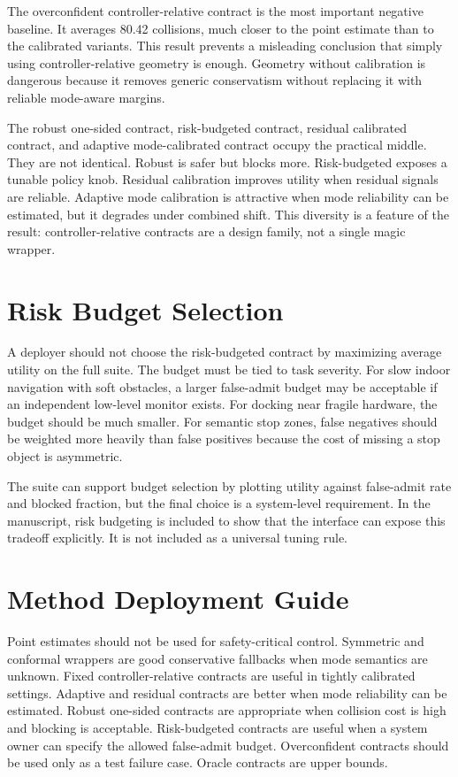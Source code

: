 \documentclass{article}
\begin{document}
The overconfident controller-relative contract is the most important negative baseline. It averages 80.42 collisions, much closer to the point estimate than to the calibrated variants. This result prevents a misleading conclusion that simply using controller-relative geometry is enough. Geometry without calibration is dangerous because it removes generic conservatism without replacing it with reliable mode-aware margins.

The robust one-sided contract, risk-budgeted contract, residual calibrated contract, and adaptive mode-calibrated contract occupy the practical middle. They are not identical. Robust is safer but blocks more. Risk-budgeted exposes a tunable policy knob. Residual calibration improves utility when residual signals are reliable. Adaptive mode calibration is attractive when mode reliability can be estimated, but it degrades under combined shift. This diversity is a feature of the result: controller-relative contracts are a design family, not a single magic wrapper.

\section{Risk Budget Selection}

A deployer should not choose the risk-budgeted contract by maximizing average utility on the full suite. The budget must be tied to task severity. For slow indoor navigation with soft obstacles, a larger false-admit budget may be acceptable if an independent low-level monitor exists. For docking near fragile hardware, the budget should be much smaller. For semantic stop zones, false negatives should be weighted more heavily than false positives because the cost of missing a stop object is asymmetric.

The suite can support budget selection by plotting utility against false-admit rate and blocked fraction, but the final choice is a system-level requirement. In the manuscript, risk budgeting is included to show that the interface can expose this tradeoff explicitly. It is not included as a universal tuning rule.

\section{Method Deployment Guide}

Point estimates should not be used for safety-critical control. Symmetric and conformal wrappers are good conservative fallbacks when mode semantics are unknown. Fixed controller-relative contracts are useful in tightly calibrated settings. Adaptive and residual contracts are better when mode reliability can be estimated. Robust one-sided contracts are appropriate when collision cost is high and blocking is acceptable. Risk-budgeted contracts are useful when a system owner can specify the allowed false-admit budget. Overconfident contracts should be used only as a test failure case. Oracle contracts are upper bounds.
\end{document}
